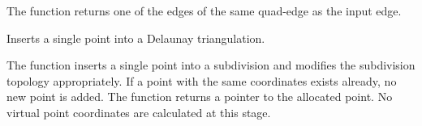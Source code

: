 The function returns one of the edges of the same quad-edge as the input edge.

Inserts a single point into a Delaunay triangulation.


\begin{description}
\end{description}

The function inserts a single point into a subdivision and modifies the subdivision topology appropriately. If a point with the same coordinates exists already, no new point is added. The function returns a pointer to the allocated point. No virtual point coordinates are calculated at this stage.

\fi